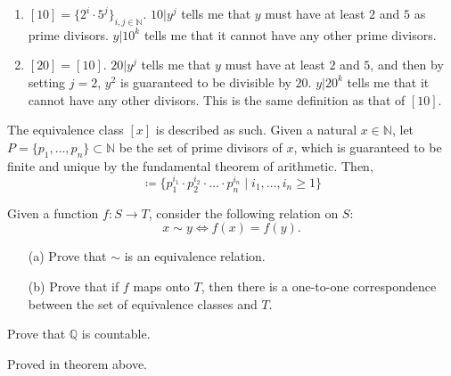 \begin{solution}
\begin{enumerate}
      \item $[10] = \{2^i \cdot 5^j\}_{i, j \in \mathbb{N}}$. $10 | y^j$ tells me that $y$ must have at least $2$ and $5$ as prime divisors. $y | 10^k$ tells me that it cannot have any other prime divisors. 
      \item $[20] = [10]$. $20 | y^j$ tells me that $y$ must have at least $2$ and $5$, and then by setting $j = 2$, $y^2$ is guaranteed to be divisible by $20$. $y | 20^k$ tells me that it cannot have any other divisors. This is the same definition as that of $[10]$.  
    \end{enumerate}
    The equivalence class $[x]$ is described as such. Given a natural $x \in \mathbb{N}$, let $P = \{p_1, \ldots, p_n\} \subset \mathbb{N}$ be the set of prime divisors of $x$, which is guaranteed to be finite and unique by the fundamental theorem of arithmetic. Then, 
    \begin{equation}
      [x] \coloneqq \{ p_1^{i_1} \cdot p_2^{i_2} \cdot \ldots \cdot p_n^{i_n} \mid i_1, \ldots, i_n \geq 1 \}
    \end{equation}
  \end{solution}

  \begin{exercise}
    Given a function $f: S \to T$, consider the following relation on $S$:
    $$x \sim y \Leftrightarrow f(x) = f(y).$$
    \begin{enumerate}
      \item[(a)] Prove that $\sim$ is an equivalence relation.
      \item[(b)] Prove that if $f$ maps onto $T$, then there is a one-to-one correspondence between the set of equivalence classes and $T$.
    \end{enumerate}
  \end{exercise}
  
  \begin{exercise}
    Prove that $\mathbb{Q}$ is countable. 
  \end{exercise}
  \begin{solution}
    Proved in theorem above. 
  \end{solution}

